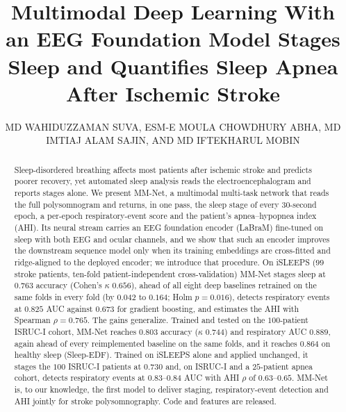 \documentclass{ieeeaccess}
\newcommand{\mmAcc}{0.763}
\newcommand{\mmK}{0.656}
\newcommand{\mmAuc}{0.825}
\newcommand{\mmRho}{0.765}
\newcommand{\isrAcc}{0.803}
\begin{document}

\title{Multimodal Deep Learning With an EEG Foundation Model Stages Sleep and Quantifies
Sleep Apnea After Ischemic Stroke}

\author{\uppercase{Md Wahiduzzaman Suva},
\uppercase{Esm-e Moula Chowdhury Abha},
\uppercase{Md Imtiaj Alam Sajin},
AND \uppercase{Md Iftekharul Mobin}}

\address[1]{Department of Computer Science and Engineering, American International
University-Bangladesh, Dhaka 1229, Bangladesh}



\titlepgskip=-21pt

\begin{abstract}
Sleep-disordered breathing affects most patients after ischemic stroke and predicts poorer
recovery, yet automated sleep analysis reads the electroencephalogram and reports stages
alone. We present MM-Net, a multimodal multi-task network that reads the full polysomnogram
and returns, in one pass, the sleep stage of every 30-second epoch, a per-epoch
respiratory-event score and the patient's apnea--hypopnea index (AHI). Its neural stream
carries an EEG foundation encoder (LaBraM) fine-tuned on sleep with both EEG and ocular
channels, and we show that such an encoder improves the downstream sequence model only when its
training embeddings are cross-fitted and ridge-aligned to the deployed encoder; we introduce
that procedure. On iSLEEPS ($99$ stroke patients, ten-fold patient-independent
cross-validation) MM-Net stages sleep at $\mmAcc$ accuracy (Cohen's $\kappa$ $\mmK$), ahead of
all eight deep baselines retrained on the same folds in every fold (by $0.042$ to $0.164$; Holm
$p=0.016$), detects respiratory events at $\mmAuc$ AUC against $0.673$ for gradient boosting,
and estimates the AHI with Spearman $\rho=\mmRho$. The gains generalize. Trained and tested on
the $100$-patient ISRUC-I cohort, MM-Net reaches $\isrAcc$ accuracy ($\kappa$ $0.744$) and
respiratory AUC $0.889$, again ahead of every reimplemented baseline on the same folds, and it
reaches $0.864$ on healthy sleep (Sleep-EDF). Trained on iSLEEPS alone and applied unchanged, it stages
the $100$ ISRUC-I patients at $0.730$ and, on ISRUC-I and a $25$-patient apnea cohort, detects
respiratory events at $0.83$--$0.84$ AUC with AHI $\rho$ of $0.63$--$0.65$. MM-Net is, to our knowledge, the first model to deliver staging,
respiratory-event detection and AHI jointly for stroke polysomnography. Code and features are
released.
\end{abstract}
\end{document}
